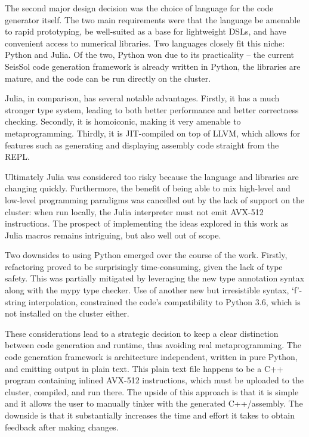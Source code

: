 The second major design decision was the choice of language for the code generator itself. The two main requirements were that the language be amenable to rapid prototyping, be well-suited as a base for lightweight \glspl{DSL}, and have convenient access to numerical libraries. Two languages closely fit this niche: Python and Julia. Of the two, Python won due to its practicality -- the current SeisSol code generation framework is already written in Python, the libraries are mature, and the code can be run directly on the cluster. 

Julia, in comparison, has several notable advantages. Firstly, it has a much stronger type system, leading to both better performance and better correctness checking. Secondly, it is homoiconic, making it very amenable to metaprogramming. Thirdly, it is JIT-compiled on top of LLVM, which allows for features such as generating and displaying assembly code straight from the REPL. 

Ultimately Julia was considered too risky because the language and libraries are changing quickly. Furthermore, the benefit of being able to mix high-level and low-level programming paradigms was cancelled out by the lack of support on the cluster: when run locally, the Julia interpreter must not emit AVX-512 instructions. The prospect of implementing the ideas explored in this work as Julia macros remains intriguing, but also well out of scope.

Two downsides to using Python emerged over the course of the work. Firstly, refactoring proved to be surprisingly time-consuming, given the lack of type safety. This was partially mitigated by leveraging the new type annotation syntax along with the mypy type checker. Use of another new but irresistible syntax, `f'-string interpolation, constrained the code's compatibility to Python 3.6, which is not installed on the cluster either.

These considerations lead to a strategic decision to keep a clear distinction between code generation and runtime, thus avoiding real metaprogramming. The code generation framework is architecture independent, written in pure Python, and emitting output in plain text. This plain text file happens to be a C++ program containing inlined AVX-512 instructions, which must be uploaded to the cluster, compiled, and run there. The upside of this approach is that it is simple and it allows the user to manually tinker with the generated C++/assembly. The downside is that it substantially increases the time and effort it takes to obtain feedback after making changes. 


